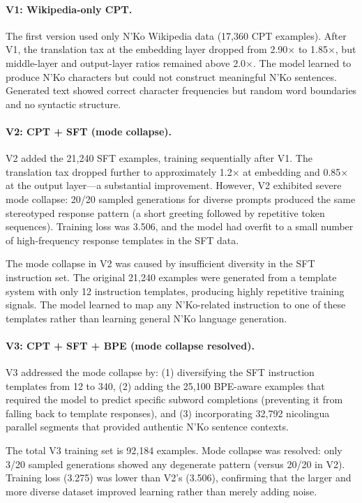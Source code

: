 \documentclass[11pt]{article}
\begin{document}
\paragraph{V1: Wikipedia-only CPT.}
The first version used only N'Ko Wikipedia data (17,360 CPT examples).
After V1, the translation tax at the embedding layer dropped from 2.90$\times$ to 1.85$\times$, but middle-layer and output-layer ratios remained above 2.0$\times$.
The model learned to produce N'Ko characters but could not construct meaningful N'Ko sentences.
Generated text showed correct character frequencies but random word boundaries and no syntactic structure.

\paragraph{V2: CPT + SFT (mode collapse).}
V2 added the 21,240 SFT examples, training sequentially after V1.
The translation tax dropped further to approximately 1.2$\times$ at embedding and 0.85$\times$ at the output layer---a substantial improvement.
However, V2 exhibited severe mode collapse: 20/20 sampled generations for diverse prompts produced the same stereotyped response pattern (a short greeting followed by repetitive token sequences).
Training loss was 3.506, and the model had overfit to a small number of high-frequency response templates in the SFT data.

The mode collapse in V2 was caused by insufficient diversity in the SFT instruction set.
The original 21,240 examples were generated from a template system with only 12 instruction templates, producing highly repetitive training signals.
The model learned to map any N'Ko-related instruction to one of these templates rather than learning general N'Ko language generation.

\paragraph{V3: CPT + SFT + BPE (mode collapse resolved).}
V3 addressed the mode collapse by: (1) diversifying the SFT instruction templates from 12 to 340, (2) adding the 25,100 BPE-aware examples that required the model to predict specific subword completions (preventing it from falling back to template responses), and (3) incorporating 32,792 nicolingua parallel segments that provided authentic N'Ko sentence contexts.

The total V3 training set is 92,184 examples.
Mode collapse was resolved: only 3/20 sampled generations showed any degenerate pattern (versus 20/20 in V2).
Training loss (3.275) was lower than V2's (3.506), confirming that the larger and more diverse dataset improved learning rather than merely adding noise.
\end{document}
